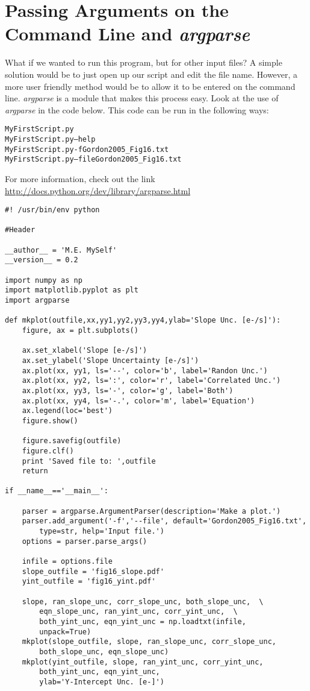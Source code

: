 \section{Passing Arguments on the Command Line and \textit{argparse}}
What if we wanted to run this program, but for other input files?  A
simple solution would be to just open up our script and edit the file
name.  However, a more user friendly method would be to allow it to be
entered on the command line.  \textit{argparse} is a module that
makes this process easy.  Look at the use of \textit{argparse} in the code 
below.  This code can be run in the following ways:

\begin{alltt}
\termtab MyFirstScript.py 
\termtab MyFirstScript.py --help
\termtab MyFirstScript.py -f Gordon2005_Fig16.txt
\termtab MyFirstScript.py --file Gordon2005_Fig16.txt
\end{alltt}
For more information, check out the link
\url{http://docs.python.org/dev/library/argparse.html}

\begin{verbatim}
#! /usr/bin/env python

#Header

__author__ = 'M.E. MySelf'
__version__ = 0.2

import numpy as np
import matplotlib.pyplot as plt
import argparse

def mkplot(outfile,xx,yy1,yy2,yy3,yy4,ylab='Slope Unc. [e-/s]'):
    figure, ax = plt.subplots()

    ax.set_xlabel('Slope [e-/s]')
    ax.set_ylabel('Slope Uncertainty [e-/s]')
    ax.plot(xx, yy1, ls='--', color='b', label='Randon Unc.')
    ax.plot(xx, yy2, ls=':', color='r', label='Correlated Unc.')
    ax.plot(xx, yy3, ls='-', color='g', label='Both')
    ax.plot(xx, yy4, ls='-.', color='m', label='Equation')
    ax.legend(loc='best')
    figure.show()

    figure.savefig(outfile) 
    figure.clf()
    print 'Saved file to: ',outfile 
    return  
    
if __name__=='__main__': 

    parser = argparse.ArgumentParser(description='Make a plot.')
    parser.add_argument('-f','--file', default='Gordon2005_Fig16.txt', 
        type=str, help='Input file.')
    options = parser.parse_args()

    infile = options.file 
    slope_outfile = 'fig16_slope.pdf'  
    yint_outfile = 'fig16_yint.pdf'  
    
    slope, ran_slope_unc, corr_slope_unc, both_slope_unc,  \
        eqn_slope_unc, ran_yint_unc, corr_yint_unc,  \
        both_yint_unc, eqn_yint_unc = np.loadtxt(infile, 
        unpack=True) 
    mkplot(slope_outfile, slope, ran_slope_unc, corr_slope_unc,  
        both_slope_unc, eqn_slope_unc) 
    mkplot(yint_outfile, slope, ran_yint_unc, corr_yint_unc,  
        both_yint_unc, eqn_yint_unc,
        ylab='Y-Intercept Unc. [e-]')
\end{verbatim}

